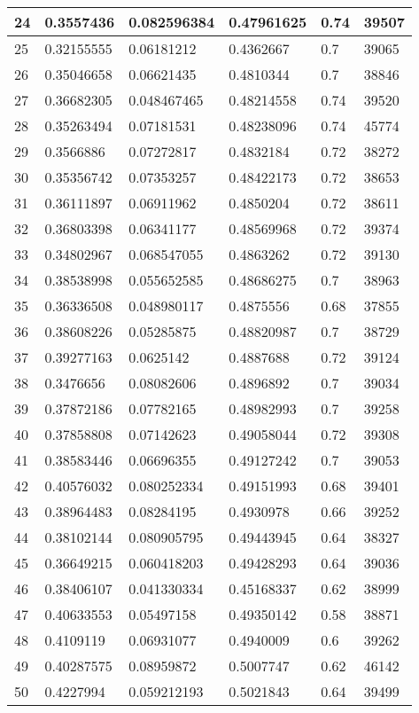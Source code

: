 \begin{longtable}{|l|l|l|l|l|l|}
24 & 0.3557436 & 0.082596384 & 0.47961625 & 0.74 & 39507 \\ \hline 
25 & 0.32155555 & 0.06181212 & 0.4362667 & 0.7 & 39065 \\ \hline 
26 & 0.35046658 & 0.06621435 & 0.4810344 & 0.7 & 38846 \\ \hline 
27 & 0.36682305 & 0.048467465 & 0.48214558 & 0.74 & 39520 \\ \hline 
28 & 0.35263494 & 0.07181531 & 0.48238096 & 0.74 & 45774 \\ \hline 
29 & 0.3566886 & 0.07272817 & 0.4832184 & 0.72 & 38272 \\ \hline 
30 & 0.35356742 & 0.07353257 & 0.48422173 & 0.72 & 38653 \\ \hline 
31 & 0.36111897 & 0.06911962 & 0.4850204 & 0.72 & 38611 \\ \hline 
32 & 0.36803398 & 0.06341177 & 0.48569968 & 0.72 & 39374 \\ \hline 
33 & 0.34802967 & 0.068547055 & 0.4863262 & 0.72 & 39130 \\ \hline 
34 & 0.38538998 & 0.055652585 & 0.48686275 & 0.7 & 38963 \\ \hline 
35 & 0.36336508 & 0.048980117 & 0.4875556 & 0.68 & 37855 \\ \hline 
36 & 0.38608226 & 0.05285875 & 0.48820987 & 0.7 & 38729 \\ \hline 
37 & 0.39277163 & 0.0625142 & 0.4887688 & 0.72 & 39124 \\ \hline 
38 & 0.3476656 & 0.08082606 & 0.4896892 & 0.7 & 39034 \\ \hline 
39 & 0.37872186 & 0.07782165 & 0.48982993 & 0.7 & 39258 \\ \hline 
40 & 0.37858808 & 0.07142623 & 0.49058044 & 0.72 & 39308 \\ \hline 
41 & 0.38583446 & 0.06696355 & 0.49127242 & 0.7 & 39053 \\ \hline 
42 & 0.40576032 & 0.080252334 & 0.49151993 & 0.68 & 39401 \\ \hline 
43 & 0.38964483 & 0.08284195 & 0.4930978 & 0.66 & 39252 \\ \hline 
44 & 0.38102144 & 0.080905795 & 0.49443945 & 0.64 & 38327 \\ \hline 
45 & 0.36649215 & 0.060418203 & 0.49428293 & 0.64 & 39036 \\ \hline 
46 & 0.38406107 & 0.041330334 & 0.45168337 & 0.62 & 38999 \\ \hline 
47 & 0.40633553 & 0.05497158 & 0.49350142 & 0.58 & 38871 \\ \hline 
48 & 0.4109119 & 0.06931077 & 0.4940009 & 0.6 & 39262 \\ \hline 
49 & 0.40287575 & 0.08959872 & 0.5007747 & 0.62 & 46142 \\ \hline 
50 & 0.4227994 & 0.059212193 & 0.5021843 & 0.64 & 39499 \\ \hline 
\end{longtable}